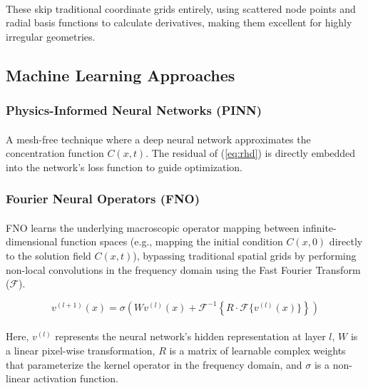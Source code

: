 \paragraph{}
These skip traditional coordinate grids entirely, using scattered node points and radial basis functions to calculate derivatives, making them excellent for highly irregular geometries.

\subsection*{Machine Learning Approaches}
\subsubsection*{Physics-Informed Neural Networks (PINN)}
\paragraph{}
A mesh-free technique where a deep neural network approximates the concentration function $C(x,t)$. The residual of (\ref{eq:rhd}) is directly embedded into the network's loss function to guide optimization.

\subsubsection*{Fourier Neural Operators (FNO)}
\paragraph{}
FNO learns the underlying macroscopic operator mapping between infinite-dimensional function spaces (e.g., mapping the initial condition $C(x,0)$ directly to the solution field $C(x,t)$), bypassing traditional spatial grids by performing non-local convolutions in the frequency domain using the Fast Fourier Transform ($\mathcal{F}$).

\begin{equation*}
v^{(l+1)}(x) = \sigma \left( W v^{(l)}(x) + \mathcal{F}^{-1} \left\{ R \cdot \mathcal{F}\{v^{(l)}(x)\} \right\} \right)
\end{equation*}
\paragraph{}
Here, $v^{(l)}$ represents the neural network's hidden representation at layer $l$, $W$ is a linear pixel-wise transformation, $R$ is a matrix of learnable complex weights that parameterize the kernel operator in the frequency domain, and $\sigma$ is a non-linear activation function. 
